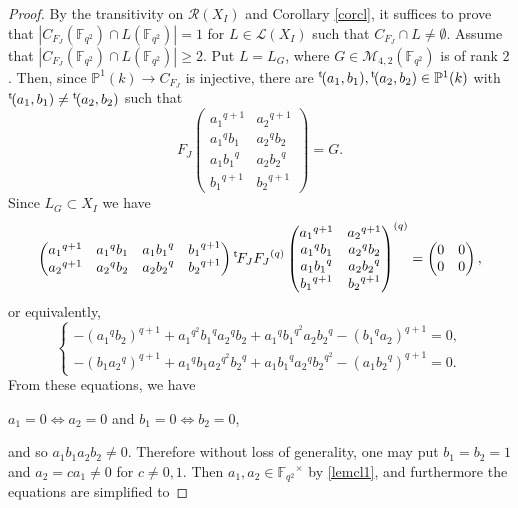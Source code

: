 \documentclass[11pt]{amsart}
\newcommand{\lt}{{}^\mathrm t\hspace{-0.5mm}}
\newcommand{\pmat}[1]{\begin{pmatrix} #1 \end{pmatrix}}
\theoremstyle{plain} %
\theoremstyle{definition} %
\theoremstyle{remark} %
\begin{document}
\begin{proof}
By the transitivity on $\mathcal{R}(X_I)$ and Corollary \ref{corcl}, it suffices to prove that $|C_{F_J}(\mathbb{F}_{q^2})\cap L(\mathbb{F}_{q^2})|=1$ for $L\in\mathcal{L}(X_I)$ such that $C_{F_J}\cap L\neq\emptyset$.
Assume that $|C_{F_J}(\mathbb{F}_{q^2})\cap L(\mathbb{F}_{q^2})|\ge2$. Put $L=L_G$, where $G\in\mathcal{M}_{4,2}(\mathbb{F}_{q^2})$ is of rank $2$. Then, since $\mathbb{P}^1(k)\rightarrow C_{F_J}$ is injective, there are $\lt(a_1,b_1),\lt(a_2,b_2)\in\mathbb{P}^1(k)$ with  $\lt(a_1,b_1)\neq\lt(a_2,b_2)$ such that 
\begin{equation}\label{lemcl1}
F_J\pmat{{a_1}^{q+1}&{a_2}^{q+1}\\{a_1}^qb_1&{a_2}^qb_2\\a_1{b_1}^q&a_2{b_2}^q\\{b_1}^{q+1}&{b_2}^{q+1}}=G.
\end{equation}
Since $L_G\subset X_I$ we have
$$
\pmat{{a_1}^{q+1} & {a_1}^q b_1 & a_1{ b_1}^q & {b_1}^{q+1} \\ {a_2}^{q+1} & {a_2}^q b_2 & a_2 {b_2}^q & {b_2}^{q+1}}\lt F_J{F_J}^{(q)}\pmat{{a_1}^{q+1}&{a_2}^{q+1}\\{a_1}^qb_1&{a_2}^qb_2\\a_1{b_1}^q&a_2{b_2}^q\\{b_1}^{q+1}&{b_2}^{q+1}}^{(q)}=\pmat{0&0\\0&0},
$$
or equivalently,
$$
\begin{cases}
-({a_1}^qb_2)^{q+1}+{a_1}^{q^2}{b_1}^q{a_2}^qb_2+{a_1}^q{b_1}^{q^2}a_2{b_2}^q-({b_1}^qa_2)^{q+1}=0,\\
-(b_1{a_2}^q)^{q+1}+{a_1}^{q}{b_1}{a_2}^{q^2}{b_2}^q+{a_1}{b_1}^{q}{a_2}^q{b_2}^{q^2}-(a_1{b_2}^q)^{q+1}=0.
\end{cases}
$$
From these equations, we have 
\begin{center}
$a_1=0\iff a_2=0$ and $b_1=0\iff b_2=0$, 
\end{center}
and so $a_1b_1a_2b_2\neq0$. Therefore without loss of generality, one may put $b_1=b_2=1$ and $a_2=ca_1\neq0$ for $c\neq0,1$. Then $a_1,a_2\in{\mathbb{F}_{q^2}}^\times$ by \eqref{lemcl1}, and furthermore the equations are simplified to

\end{proof}
\end{document}
